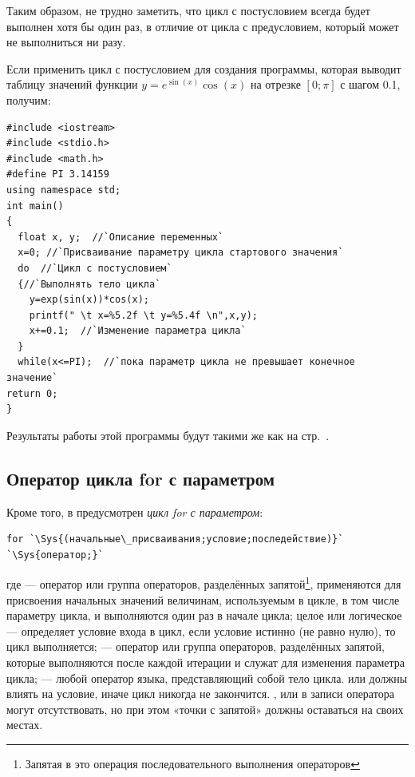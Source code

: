 Таким образом, не трудно заметить, что цикл с постусловием всегда будет выполнен хотя бы один раз, в отличие от цикла с
предусловием, который может не выполниться ни разу.

Если применить цикл с постусловием для создания программы, которая выводит таблицу 
значений функции  $y=e^{\sin (x)}\cos(x)$  на отрезке  $[0;\pi]$  с шагом 0.1, получим:

\begin{lstlisting}
#include <iostream>
#include <stdio.h>
#include <math.h>
#define PI 3.14159
using namespace std;
int main()
{
  float x, y;  //`Описание переменных`
  x=0; //`Присваивание параметру цикла стартового значения`
  do  //`Цикл с постусловием`
  {//`Выполнять тело цикла`
    y=exp(sin(x))*cos(x);
    printf(" \t x=%5.2f \t y=%5.4f \n",x,y);
    x+=0.1;  //`Изменение параметра цикла`
  }
  while(x<=PI);  //`пока параметр цикла не превышает конечное значение`
return 0;
}
\end{lstlisting}

Результаты работы этой программы будут такими же как на стр.~\pageref{ch03:out0}.%

\subsection[Оператор цикла for с параметром]{Оператор цикла for с параметром}
Кроме того, в  предусмотрен \emph{цикл for с параметром}:
\begin{lstlisting}
for `\Sys{(начальные\_присваивания;условие;последействие)}`
`\Sys{оператор;}`
\end{lstlisting}
где  --- оператор или группа операторов, разделённых
запятой\footnote{Запятая в  это операция последовательного выполнения операторов}, применяются для присвоения
начальных значений величинам, используемым в цикле, в том числе параметру цикла, и выполняются один раз в начале цикла;
целое или логическое  --- определяет условие входа в цикл, если условие истинно (не равно
нулю), то цикл выполняется;  --- оператор или группа операторов, разделённых запятой,
которые выполняются после каждой итерации и служат для изменения параметра цикла;  --- любой
оператор языка, представляющий собой тело цикла.  или 
должны влиять на условие, иначе цикл никогда не закончится. ,
 или  в записи оператора  могут
отсутствовать, но при этом «точки с запятой» должны оставаться на своих местах.

